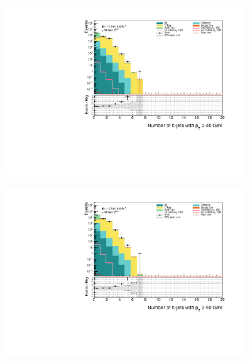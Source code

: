 \documentclass[12pt, a4paper]{book}
\begin{document}
\begin{figure}[!ht]
\begin{subfigure}[b]{0.49\textwidth}
    \end{subfigure}
    \hfill\begin{subfigure}[b]{0.49\textwidth}
        \centering
        \includegraphics[width=\textwidth]{bjetsPt40.pdf}
    \end{subfigure}
    \hfill\begin{subfigure}[b]{0.49\textwidth}
        \centering
        \includegraphics[width=\textwidth]{bjetsPt50.pdf}
    \end{subfigure}
    \hfill\begin{subfigure}[b]{0.49\textwidth}
        \centering

\end{subfigure}
\end{figure}
\end{document}
